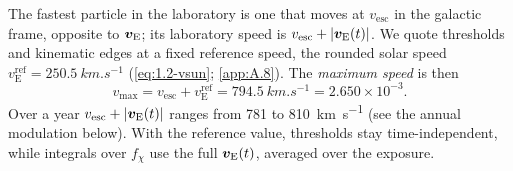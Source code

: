 The fastest particle in the laboratory is one that moves at $v_{\mathrm{esc}}$ in the galactic frame, opposite to $\bm{v}_{\mathrm{E}}$; its laboratory speed is $v_{\mathrm{esc}} + |\bm{v}_{\mathrm{E}}(t)|$. We quote thresholds and kinematic edges at a fixed reference speed, the rounded solar speed $v_{\mathrm{E}}^{\mathrm{ref}} = \SI{250.5}{km.s^{-1}}$ (\cref{eq:1.2-vsun}; \cref{app:A.8}). The \emph{maximum speed} is then
\begin{equation}
  v_{\mathrm{max}} = v_{\mathrm{esc}} + v_{\mathrm{E}}^{\mathrm{ref}} = \SI{794.5}{km.s^{-1}} = 2.650\times10^{-3}.
  \label{eq:1.2-vmax}
\end{equation}
Over a year $v_{\mathrm{esc}} + |\bm{v}_{\mathrm{E}}(t)|$ ranges from 781 to \SI{810}{km.s^{-1}} (see the annual modulation below). With the reference value, thresholds stay time-independent, while integrals over $f_\chi$ use the full $\bm{v}_{\mathrm{E}}(t)$, averaged over the exposure.


